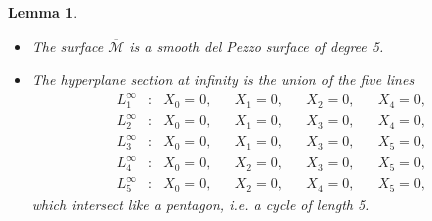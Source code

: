 \documentclass[a4paper,reqno]{amsart}
\numberwithin{equation}{section}
\newtheorem{lemma}[theorem]{Lemma}
\numberwithin{equation}{section}
\begin{document}
\begin{lemma} \label{lem:propertiesofMPI}
    \begin{itemize}
        \item The surface $\overline{\mathcal{M}}$ is a smooth del Pezzo surface of degree 5.
    \item  The hyperplane section at infinity is the union of the five lines
\begin{equation} \label{eq:linesatinfinityPI}
    \begin{aligned}
        L_{1}^{\infty} &: & X_0= 0 ,& &X_1 = 0 ,& & X_2 = 0 ,& &X_4= 0,\\
        L_{2}^{\infty} &: & X_0 = 0 ,& &X_1 = 0 ,& & X_3 = 0 ,& &X_4= 0,\\
        L_{3}^{\infty} &: & X_0 = 0 ,& &X_1 = 0 ,& & X_3 = 0 ,& &X_5= 0,\\
        L_{4}^{\infty} &: & X_0 = 0 ,& &X_2 = 0 ,& & X_3 = 0 ,& &X_5= 0,\\
        L_{5}^{\infty} &: & X_0 = 0 ,& &X_2 = 0 ,& & X_4 = 0 ,& &X_5= 0,
    \end{aligned}
\end{equation}
which intersect like a pentagon, i.e. a cycle of length 5.
\end{itemize}
\end{lemma}
\end{document}
